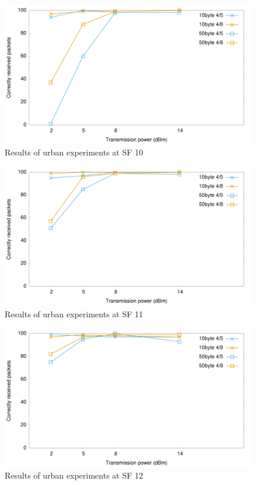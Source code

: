 \begin{figure}[]
\centering
\includegraphics[width=\textwidth]{img/test/urban/sf10}
\caption{Results of urban experiments at SF 10}
\label{fig:sf10urban}
\end{figure}

\begin{figure}[]
\centering
\includegraphics[width=\textwidth]{img/test/urban/sf11}
\caption{Results of urban experiments at SF 11}
\label{fig:sf11urban}
\end{figure}

\begin{figure}[]
\centering
\includegraphics[width=\textwidth]{img/test/urban/sf12}
\caption{Results of urban experiments at SF 12}
\label{fig:sf12urban}
\end{figure}


